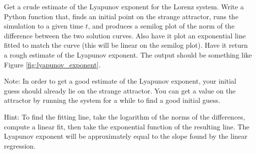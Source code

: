 \begin{problem}
Get a crude estimate of the Lyapunov exponent for the Lorenz system.
Write a Python function that, finds an initial point on the strange attractor, runs the simulation to a given time $t$, and produces a semilog plot of the norm of the difference between the two solution curves.
Also have it plot an exponential line fitted to match the curve (this will be linear on the semilog plot).
Have it return a rough estimate of the Lyapunov exponent.
The output should be something like Figure \ref{fig:lyapunov_exponent}.

Note: In order to get a good estimate of the Lyapunov exponent, your initial guess should already lie on the strange attractor.
You can get a value on the attractor by running the system for a while to find a good initial guess.

Hint: To find the fitting line, take the logarithm of the norms of the differences, compute a linear fit, then take the exponential function of the resulting line.
The Lyapunov exponent will be approximately equal to the slope found by the linear regression.
\end{problem} 
